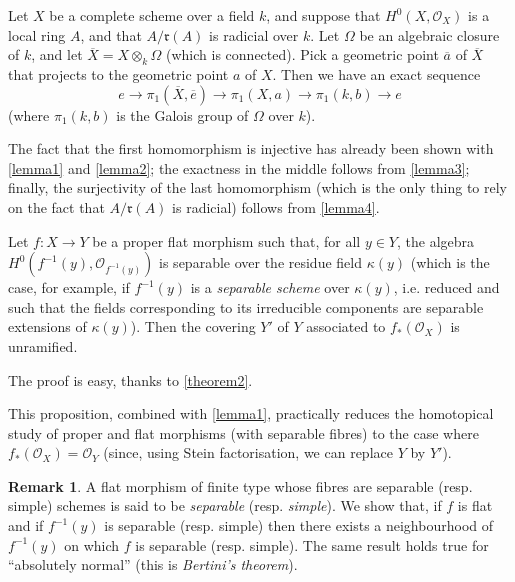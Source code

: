\documentclass{article}
\theoremstyle{plain}
\newenvironment{proposition}[1]
  {\renewcommand\theinnercustomproposition{#1}\innercustomproposition}
  {\endinnercustomproposition}
\newenvironment{lemma}[1]
  {\renewcommand\theinnercustomlemma{#1}\innercustomlemma}
  {\endinnercustomlemma}
\theoremstyle{definition}
\newtheorem*{remark}{Remark}
\newcommand{\sh}{\mathscr}
\newcommand{\fk}{\mathfrak}
\newcommand{\kres}{\kappa}
\newcommand{\oldpage}[1]{\marginpar{\footnotesize$\Big\vert$ \textit{p.~#1}}}
\begin{document}
\begin{lemma}{5}
\label{lemma5}
  Let $X$ be a complete scheme over a field $k$, and suppose that $H^0(X,\sh{O}_X)$ is a local ring $A$, and that $A/\fk{r}(A)$ is radicial over $k$.
  Let $\Omega$ be an algebraic closure of $k$, and let $\overline{X}=X\otimes_k\Omega$ (which is connected).
  Pick a geometric point $\overline{a}$ of $\overline{X}$ that projects to the geometric point $a$ of $X$.
  Then we have an exact sequence
  \[
    e
    \to \pi_1(\overline{X},\overline{e})
    \to \pi_1(X,a)
    \to \pi_1(k,b)
    \to e
  \]
  (where $\pi_1(k,b)$ is the Galois group of $\Omega$ over $k$).
\end{lemma}

The fact that the first homomorphism is injective has already been shown with \cref{lemma1} and \cref{lemma2};
the exactness in the middle follows from \cref{lemma3};
finally, the surjectivity of the last homomorphism (which is the only thing to rely on the fact that $A/\fk{r}(A)$ is radicial) follows from \cref{lemma4}.

\begin{proposition}{4}
\label{proposition4}
  Let $f\colon X\to Y$ be a proper flat morphism such that, for all $y\in Y$, the algebra $H^0(f^{-1}(y),\sh{O}_{f^{-1}(y)})$ is separable over the residue field $\kres(y)$ (which is the case, for example, if $f^{-1}(y)$ is a \emph{separable scheme} over $\kres(y)$, i.e. reduced and such that the fields corresponding to its irreducible components are separable extensions of $\kres(y)$).
  Then the covering
\oldpage{182-21}
  $Y'$ of $Y$ associated to $f_*(\sh{O}_X)$ is unramified.
\end{proposition}

The proof is easy, thanks to \cref{theorem2}.

This proposition, combined with \cref{lemma1}, practically reduces the homotopical study of proper and flat morphisms (with separable fibres) to the case where $f_*(\sh{O}_X)=\sh{O}_Y$ (since, using Stein factorisation, we can replace $Y$ by $Y'$).

\begin{remark}
  A flat morphism of finite type whose fibres are separable (resp. simple) schemes is said to be \emph{separable} (resp. \emph{simple}).
  We show that, if $f$ is flat and if $f^{-1}(y)$ is separable (resp. simple) then there exists a neighbourhood of $f^{-1}(y)$ on which $f$ is separable (resp. simple).
  The same result holds true for ``absolutely normal'' (this is \emph{Bertini's theorem}).
\end{remark}
\end{document}
